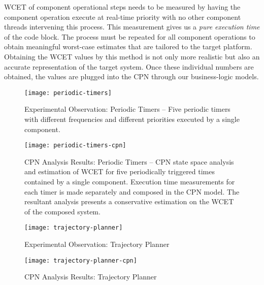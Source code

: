 WCET of component operational steps needs to be measured by having the component operation execute at real-time priority with no other component threads intervening this process. This measurement gives us a \emph{pure execution time} of the code block. The process must be repeated for all component operations to obtain meaningful worst-case estimates that are tailored to the target platform. Obtaining the WCET values by this method is not only more realistic but also an accurate representation of the target system. Once these individual numbers are obtained, the values are plugged into the CPN through our business-logic models. 

\begin{figure*}[h]
	\centering
	\texttt{[image: periodic-timers]}
	\caption{Experimental Observation: Periodic Timers -- Five periodic timers with different frequencies and different priorities executed by a single component.}
	\label{fig:periodic-timers}
\end{figure*}

\begin{figure*}[h]
	\centering
	\texttt{[image: periodic-timers-cpn]}
	\caption{CPN Analysis Results: Periodic Timers -- CPN state space analysis and estimation of WCET for five periodically triggered times contained by a single component. Execution time measurements for each timer is made separately and composed in the CPN model. The resultant analysis presents a conservative estimation on the WCET of the composed system.}
	\label{fig:periodic-timers-cpn}
\end{figure*}


\begin{figure*}[h]
	\centering
	\texttt{[image: trajectory-planner]}
	\caption{Experimental Observation: Trajectory Planner}
	\label{fig:trajectory-planner}
\end{figure*}

\begin{figure*}
	\centering
	\texttt{[image: trajectory-planner-cpn]}
	\caption{CPN Analysis Results: Trajectory Planner}
	\label{fig:trajectory-planner-cpn}
\end{figure*}


